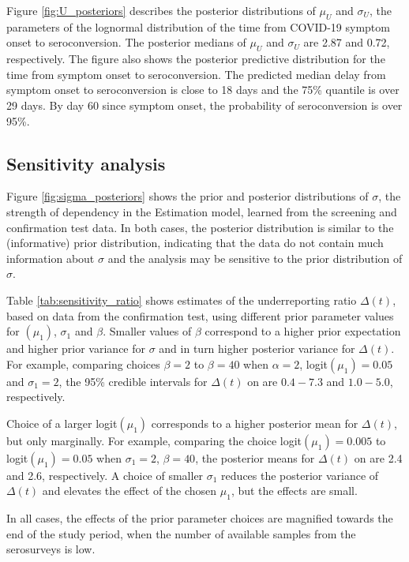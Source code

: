 \documentclass[aoas]{imsart}
\begin{document}
Figure \ref{fig:U_posteriors} describes the posterior distributions of $\mu_U$ and $\sigma_U$, the parameters of the lognormal distribution of the time from COVID-19 symptom onset to seroconversion. The posterior medians of $\mu_U$ and $\sigma_U$ are 2.87 and 0.72, respectively. The figure also shows the posterior predictive distribution for the time from symptom onset to seroconversion. The predicted median delay from symptom onset to seroconversion is close to 18 days and the 75\% quantile is over 29 days. By day 60 since symptom onset, the probability of seroconversion is over 95\%.


\subsection{Sensitivity analysis} \label{seq:results_sens}

Figure \ref{fig:sigma_posteriors} shows the prior and posterior distributions of $\sigma$, the strength of dependency in the Estimation model, learned from the screening and confirmation test data. In both cases, the posterior distribution is similar to the (informative) prior distribution, indicating that the data do not contain much information about $\sigma$ and the analysis may be sensitive to the prior distribution of $\sigma$.

Table \ref{tab:sensitivity_ratio} shows estimates of the underreporting ratio $\Delta(t)$, based on data from the confirmation test, using different prior parameter values for $(\mu_1)$, $\sigma_1$ and $\beta$. Smaller values of $\beta$ correspond to a higher prior expectation and higher prior variance for $\sigma$ and in turn higher posterior variance for $\Delta(t)$. For example, comparing choices $\beta = 2$ to $\beta = 40$ when $\alpha = 2$, logit$(\mu_1) = 0.05$ and $\sigma_1 = 2$, the 95\% credible intervals for $\Delta(t)$ on  are $0.4-7.3$ and $1.0-5.0$, respectively.

Choice of a larger logit$(\mu_1)$ corresponds to a higher posterior mean for $\Delta(t)$, but only marginally. For example, comparing the choice logit$(\mu_1) = 0.005$ to logit$(\mu_1) = 0.05$ when $\sigma_1 = 2$, $\beta = 40$, the posterior means for $\Delta(t)$ on  are 2.4 and 2.6, respectively. A choice of smaller $\sigma_1$ reduces the posterior variance of $\Delta(t)$ and elevates the effect of the chosen $\mu_1$, but the effects are small. 

In all cases, the effects of the prior parameter choices are magnified towards the end of the study period, when the number of available samples from the serosurveys is low.
\end{document}
